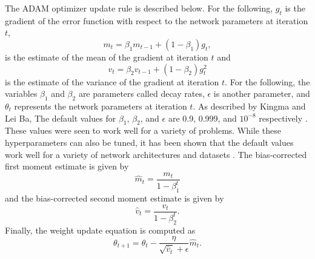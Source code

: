 The ADAM optimizer update rule is described below. For the following, $g_t$ is the gradient of the error function with respect to the network parameters at iteration $t$, 
\begin{equation} \label{eq:adam1}
m_t = \beta_1 m_{t-1} + (1 - \beta_1) g_t,
\end{equation}
is the estimate of the mean of the gradient at iteration $t$ and
\begin{equation} \label{eq:adam2}
v_t = \beta_2 v_{t-1} + (1 - \beta_2) g_t^2
\end{equation}
is the estimate of the variance of the gradient at iteration $t$. For the following, the variables $\beta_1$ and $\beta_2$ are parameters called decay rates, $\epsilon$ is another parameter, and $\theta_t$ represents the network parameters at iteration $t$. As described by Kingma and Lei Ba, The default values for $\beta_1$, $\beta_2$, and $\epsilon$ are 0.9, 0.999, and $10^{-8}$ respectively \cite{Kingma2015}. These values were seen to work well for a variety of problems. While these hyperparameters can also be tuned, it has been shown that the default values work well for a variety of network architectures and datasets \cite{Kingma2015}. The bias-corrected first moment estimate is given by
\begin{equation} \label{eq:adam3}
\hat{m}_t = \dfrac{m_t}{1 - \beta^t_1}
\end{equation}
and the bias-corrected second moment estimate is given by 
\begin{equation} \label{eq:adam4}
\hat{v}_t = \dfrac{v_t}{1 - \beta^t_2}.
\end{equation}
Finally, the weight update equation is computed as
\begin{equation} \label{eq:adam5}
\theta_{t+1} = \theta_{t} - \dfrac{\eta}{\sqrt{\hat{v}_t} + \epsilon} \hat{m}_t.
\end{equation}





